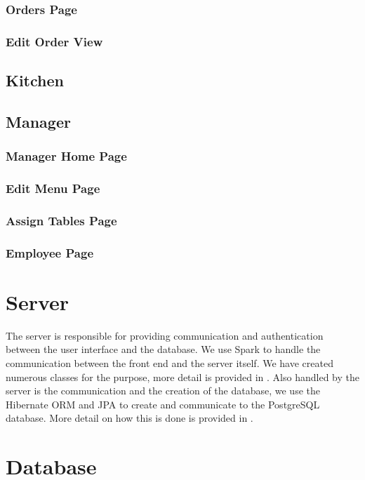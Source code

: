 \documentclass[12pt, twoside, a4paper]{report}
\begin{document}
\subsubsection*{Orders Page}

\subsubsection*{Edit Order View}

\subsection*{Kitchen}

\subsection*{Manager}
\subsubsection*{Manager Home Page}

\subsubsection*{Edit Menu Page}

\subsubsection*{Assign Tables Page}

\subsubsection*{Employee Page}

\section*{Server}
The server is responsible for providing communication and authentication between the user interface and the database.
We use Spark to handle the communication between the front end and the server itself. We have created numerous classes for the purpose, more detail is provided in \textit{\label{section:endpoints}}.
Also handled by the server is the communication and the creation of the database, we use the Hibernate ORM and JPA to create and communicate to the PostgreSQL database. More detail on how this is done is provided in \textit{\label{section:database}}.

\section*{Database}
\end{document}
